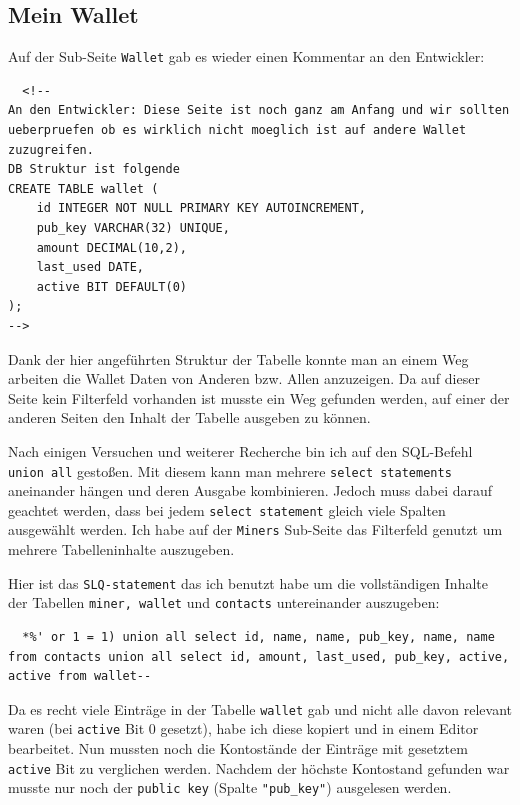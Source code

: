 \documentclass[12pt,a4paper,titlepage,oneside]{scrartcl}
\begin{document}
\subsection{Mein Wallet}

Auf der Sub-Seite \lstinline{Wallet} gab es wieder einen Kommentar an den Entwickler:

\begin{lstlisting}
  <!--
An den Entwickler: Diese Seite ist noch ganz am Anfang und wir sollten ueberpruefen ob es wirklich nicht moeglich ist auf andere Wallet zuzugreifen.
DB Struktur ist folgende
CREATE TABLE wallet (
	id INTEGER NOT NULL PRIMARY KEY AUTOINCREMENT,
	pub_key VARCHAR(32) UNIQUE,
	amount DECIMAL(10,2),
	last_used DATE,
	active BIT DEFAULT(0)
);
-->
\end{lstlisting}

Dank der hier angeführten Struktur der Tabelle konnte man an einem Weg arbeiten die Wallet Daten von Anderen bzw. Allen anzuzeigen. Da auf dieser Seite kein Filterfeld vorhanden ist musste ein Weg gefunden werden, auf einer der anderen Seiten den Inhalt der Tabelle ausgeben zu können.

Nach einigen Versuchen und weiterer Recherche bin ich auf den SQL-Befehl \lstinline{union all} gestoßen. Mit diesem kann man mehrere \lstinline{select statements} aneinander hängen und deren Ausgabe kombinieren. Jedoch muss dabei darauf geachtet werden, dass bei jedem \lstinline{select statement} gleich viele Spalten ausgewählt werden. Ich habe auf der \lstinline{Miners} Sub-Seite das Filterfeld genutzt um mehrere Tabelleninhalte auszugeben.

Hier ist das \lstinline{SLQ-statement} das ich benutzt habe um die vollständigen Inhalte der Tabellen \lstinline{miner, wallet} und \lstinline{contacts} untereinander auszugeben:

\begin{lstlisting}
  *%' or 1 = 1) union all select id, name, name, pub_key, name, name from contacts union all select id, amount, last_used, pub_key, active, active from wallet--
\end{lstlisting}

Da es recht viele Einträge in der Tabelle \lstinline{wallet} gab und nicht alle davon relevant waren (bei \lstinline{active} Bit 0 gesetzt), habe ich diese kopiert und in einem Editor bearbeitet. Nun mussten noch die Kontostände der Einträge mit gesetztem \lstinline{active} Bit zu verglichen werden. Nachdem der höchste Kontostand gefunden war musste nur noch der \lstinline{public key} (Spalte \lstinline{"pub_key"}) ausgelesen werden.
\end{document}
